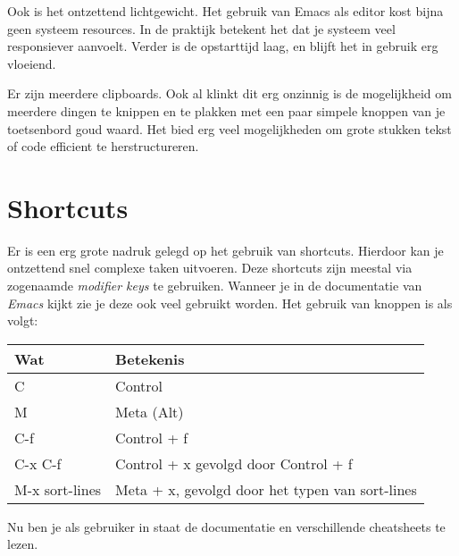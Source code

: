 Ook is het ontzettend lichtgewicht. Het gebruik van Emacs als editor kost bijna geen systeem resources. In de praktijk betekent het dat je systeem veel responsiever aanvoelt. Verder is de opstarttijd laag, en blijft het in gebruik erg vloeiend. 

Er zijn meerdere clipboards. Ook al klinkt dit erg onzinnig is de mogelijkheid om meerdere dingen te knippen en te plakken met een paar simpele knoppen van je toetsenbord goud waard. Het bied erg veel mogelijkheden om grote stukken tekst of code efficient te herstructureren. 

\section{Shortcuts}
Er is een erg grote nadruk gelegd op het gebruik van shortcuts. Hierdoor kan je ontzettend snel complexe taken uitvoeren. Deze shortcuts zijn meestal via zogenaamde \emph{modifier keys} te gebruiken. Wanneer je in de documentatie van \emph{Emacs} kijkt zie je deze ook veel gebruikt worden. Het gebruik van knoppen is als volgt:\\
\begin{tabular}[t]{ll}
  \hline
  Wat & Betekenis\\
  \hline
  C & Control\\
  M & Meta (Alt)\\
  C-f & Control + f\\
  C-x C-f & Control + x gevolgd door Control + f\\
  M-x sort-lines & Meta + x, gevolgd door het typen van sort-lines\\
\end{tabular}

Nu ben je als gebruiker in staat de documentatie en verschillende cheatsheets\cite{bib.emacs.cheatsheet} te lezen. 

